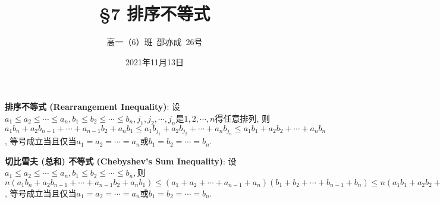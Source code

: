 \documentclass[8pt]{article}
\title{\S 7 排序不等式}
\author{高一（6）班\ 邵亦成\ 26号}
\date{2021年11月13日}
\begin{document}
	\maketitle

	\textbf{排序不等式 (Rearrangement Inequality)}: 设$a_1 \leq a_2 \leq \cdots \leq a_n, b_1 \leq b_2 \leq \cdots \leq b_n, j_1, j_2, \cdots, j_n$是$1, 2, \cdots, n$得任意排列, 则$a_1 b_n + a_2 b_{n-1} + \cdots + a_{n-1} b_2 + a_n b_1 \leq a_1 b_{j_1} + a_2 b_{j_2} + \cdots + a_n b_{j_n} \leq a_1 b_1 + a_2 b_2 + \cdots + a_n b_n$, 等号成立当且仅当$a_1 = a_2 = \cdots = a_n$或$b_1 = b_2 = \cdots = b_n$.

	\textbf{切比雪夫 (总和) 不等式 (Chebyshev's Sum Inequality)}: 设$a_1 \leq a_2 \leq \cdots \leq a_n, b_1 \leq b_2 \leq \cdots \leq b_n, $则$n(a_1 b_n + a_2 b_{n-1} + \cdots + a_{n-1} b_2 + a_n b_1) \leq (a_1 + a_2 + \cdots + a_{n-1} + a_n)(b_1 + b_2 + \cdots + b_{n-1} + b_n) \leq n(a_1 b_1 + a_2 b_2 + \cdots + a_n b_n)$, 等号成立当且仅当$a_1 = a_2 = \cdots = a_n$或$b_1 = b_2 = \cdots = b_n$.

	~\\
\end{document}
